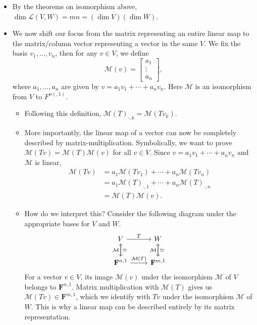 \documentclass{article}
\newcommand{\F}{\mathbf{F}}
\renewcommand{\d}{\dim}
\newcommand{\LVW}{\mathcal{L}(V,W)}
\newcommand{\M}{\mathcal{M}}
\newcommand{\bv}{v_1,\dots,v_n}
\begin{document}
\begin{itemize}
\begin{itemize}
    \end{itemize}
    \item By the theorems on isomorphism above, $\d \LVW = mn = (\d V) (\d W)$.
    \item We now shift our focus from the matrix representing an entire linear map to the matrix/column vector representing a vector in the same $V$. We fix the basis $\bv$, then for any $v \in V$, we define
    \begin{equation*}
        \M(v) = 
        \begin{bmatrix}
            a_1 \\ \vdots \\ a_n
        \end{bmatrix},
    \end{equation*}
    where $a_1,\dots,a_n$ are given by $v = a_1v_1+\cdots+a_nv_n$. Here $\M$ is an isomorphism from $V$ to $F^{n(, 1)}$.
    \begin{itemize}
        \item Following this definition, $\M(T)_{\cdot,k} = \M(Tv_k)$.
        \item More importantly, the linear map of a vector can now be completely described by matrix-multiplication. Symbolically, we want to prove $\M(Tv) = \M(T)\M(v)$ for all $v \in V$. Since $v = a_1v_1 + \cdots +a_nv_n$ and $\M$ is linear,
        \begin{align*}
            \M(Tv) & = a_1\M(Tv_1) + \cdots + a_n \M(Tv_n) \\ & = a_1\M(T)_{\cdot, 1} + \cdots + a_n\M(T)_{\cdot, n} \\ & = \M(T)\M(v).
        \end{align*}
        \item How do we interpret this? Consider the following diagram under the appropriate bases for $V$ and $W$.
        \begin{equation*}
            \begin{tikzcd}
            V \arrow[r,"T"] \arrow[d,"\simeq"]& W \arrow[d,"\simeq"] \\
            \F^{n,1} \arrow[r,"\M(T)"] \arrow[u,"\M"] & \F^{m,1} \arrow[u,"\M"]
            \end{tikzcd}
        \end{equation*}
        For a vector $v \in V$, its image $\M(v)$ under the isomorphism $\M$ of $V$ belongs to $\F^{n,1}$. Matrix multiplication with $\M(T)$ gives us $\M(Tv) \in \F^{m,1}$, which we identify with $Tv$ under the isomorphism $\M$ of $W$. This is why a linear map can be described entirely by its matrix representation.

\end{itemize}
\end{itemize}
\end{document}
